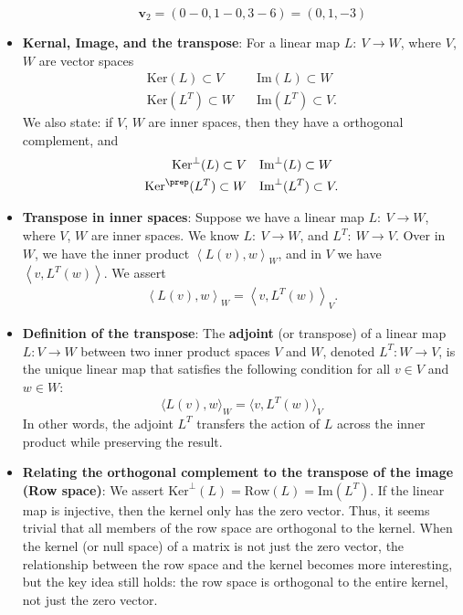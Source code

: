 \documentclass{report}
\begin{document}
\begin{itemize}
\begin{itemize}
                    \[
                        \mathbf{v}_2 = (0 - 0, 1 - 0, 3 - 6) = (0, 1, -3)
                    \]
            \end{itemize}
        \item \textbf{Kernal, Image, and the transpose}: For a linear map $L:\ V \to W$, where $V$, $W$ are vector spaces
            \begin{align*}
                \text{Ker}(L) \subset V &\quad \text{Im}(L) \subset W \\
                \text{Ker}(L^{T}) \subset W &\quad \text{Im}(L^{T}) \subset V
            .\end{align*}
            We also state: if $V$, $W$ are inner spaces, then they have a orthogonal complement, and
            \begin{align*}
                \text{Ker}^{\perp}(L) \subset V &\quad \text{Im}^{\perp}(L) \subset W \\
                \text{Ker}^{\prep}(L^{T}) \subset W &\quad \text{Im}^{\perp}(L^{T}) \subset V
            .\end{align*}
        \item \textbf{Transpose in inner spaces}: Suppose we have a linear map $L:\ V \to W$, where $V$, $W$ are inner spaces. We know $L:\ V \to W$, and $L^{T}:\  W \to V$. Over in $W$, we have the inner product $\left\langle L(v), w\right\rangle_{W}$, and in $V$ we have $\left\langle v, L^{T}(w) \right\rangle $. We assert
            \begin{align*}
                \left\langle L(v), w \right\rangle_{W} = \left\langle v, L^{T}(w) \right\rangle_{V}
            .\end{align*}
        \item \textbf{Definition of the transpose}: The \textbf{adjoint} (or transpose) of a linear map \( L: V \to W \) between two inner product spaces \( V \) and \( W \), denoted \( L^T: W \to V \), is the unique linear map that satisfies the following condition for all \( v \in V \) and \( w \in W \):
            \[
                \langle L(v), w \rangle_W = \langle v, L^T(w) \rangle_V
            \]
            In other words, the adjoint \( L^T \) transfers the action of \( L \) across the inner product while preserving the result.
        \item \textbf{Relating the orthogonal complement to the transpose of the image (Row space)}: We assert $\text{Ker}^{\perp}(L) = \text{Row}(L) = \text{Im}(L^{T})$. If the linear map is injective, then the kernel only has the zero vector. Thus, it seems trivial that all members of the row space are orthogonal to the kernel. When the kernel (or null space) of a matrix is not just the zero vector, the relationship between the row space and the kernel becomes more interesting, but the key idea still holds: the row space is orthogonal to the entire kernel, not just the zero vector.

\end{itemize}
\end{document}
